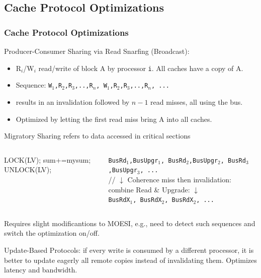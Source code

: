 \documentclass{beamer}
\renewcommand{\emph}[1]{\textcolor{structure}{#1}}
\newcommand{\emp}[1]{\textcolor{DikuRed}{ #1}}
\begin{document}
\subsection{Cache Protocol Optimizations}
\begin{frame}[fragile,t]
\frametitle{Cache Protocol Optimizations}

\emph{Producer-Consumer Sharing via Read Snarfing (Broadcast):}
\begin{scriptsize}
\begin{itemize}
    \item {R$_i$/W$_i$} read/write of block A by processor {\tt i}. All caches have a copy of A.
    \item Sequence: {\tt W$_1$,R$_2$,R$_3$,..,R$_n$, W$_1$,R$_2$,R$_3$,..,R$_n$, ...}\pause
    \item \emp{results in an invalidation followed by $n-1$ read misses, all using the bus.}
    \item \emph{Optimized by letting the first read miss bring A into all caches.}
\end  {itemize}
\end{scriptsize}
\bigskip

\begin{block}{Migratory Sharing refers to data accessed in critical sections}
\begin{columns}
\begin{colorcode}[fontsize=\scriptsize]
LOCK(LV);
    sum+=mysum;
UNLOCK(LV);
\end{colorcode} 
\begin{scriptsize}
{\tt BusRd$_1$,BusUpgr$_1$, BusRd$_2$,BusUpgr$_2$, BusRd$_3$,BusUpgr$_3$, ...}\\
\emp{// $\downarrow$ Coherence miss then invalidation: combine Read \& Upgrade: $\downarrow$}\\
{\tt BusRdX$_1$, BusRdX$_2$, BusRdX$_2$, ...}
\end{scriptsize}
\end{columns}
\end{block}

Requires slight modificantions to MOESI, e.g., need to detect such sequences
and switch the optimization on/off.
\bigskip

\emph{Update-Based Protocols}: if every write is consumed by a different processor,
it is better to update eagerly all remote copies instead of invalidating them.
\emp{Optimizes latency and bandwidth.}

\end{frame}
\end{document}
